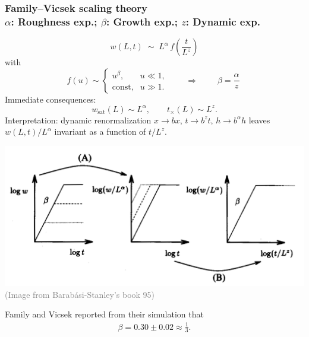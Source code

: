 \documentclass[9pt,table,xcolor=dvipsnames]{beamer}
\begin{document}
\begin{frame}[t]
   \frametitle{Family--Vicsek scaling theory \\ 
   \small $\alpha$: Roughness exp.; $\beta$: Growth exp.; $z$: Dynamic exp.}
   \small
  \[
    \boxed{\;w(L,t)\;\sim\; L^{\alpha}\, f\!\left(\dfrac{t}{L^{z}}\right)\;}
  \]
  with
  \[
    f(u)\sim 
    \begin{cases}
      u^{\beta},    & u\ll1, \\
      \text{const}, & u\gg1.
    \end{cases}
    \qquad\Rightarrow\qquad
    \boxed{\;\beta=\dfrac{\alpha}{z}\;}
  \]
  Immediate consequences:
  \[
    w_{\mathrm{sat}}(L) \sim L^{\alpha},\qquad
    t_\times(L)\sim L^{z}.
  \]
  Interpretation: dynamic renormalization $x\!\to\! b x$, $t\!\to\! b^{z}t$,
  $h\!\to\! b^{\alpha}h$ leaves $w(L,t)/L^{\alpha}$ invariant as a function of
  $t/L^{z}$.

  \vfill
  \begin{center}
    \includegraphics[width=0.6\linewidth]{./figs/FV.png} \\

    {\footnotesize \textcolor{gray}{(Image from Barab\'asi-Stanley's book 95)}}
  \end{center}

\end{frame}
\begin{frame}[fragile] %
 
  Family and Vicsek reported from their simulation that 
  \begin{align*}
    \beta = 0.30 \pm 0.02 \approx \frac{1}{3}.
  \end{align*}
  
\end{frame}
\end{document}
